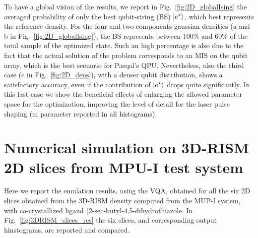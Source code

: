\documentclass[fleqn,10pt]{wlscirep}
\begin{document}
To have a global vision of the results, we report in Fig.~\ref{fig:2D_globalIsing} the averaged probability of only the best qubit-string (BS) $\ket{e^*}$, which best represents the reference density. For the four and two components gaussian densities (a and b in Fig.~\ref{fig:2D_globalIsing}), the BS represents between 100\% and 60\% of the total sample of the optimized state. Such an high percentage is also due to the fact that the actual solution of the problem corresponds to an MIS on the qubit array, which is the best scenario for Pasqal's QPU. Nevertheless, also the third case (c in Fig.~\ref{fig:2D_dens}), with a denser qubit distribution, shows a satisfactory accuracy, even if the contribution of $\ket{e^*}$ drops quite significantly. In this last case we show the beneficial effects of enlarging the allowed parameter space for the optimization, improving the level of detail for the laser pulse shaping (m parameter reported in all histograms).

\section{Numerical simulation on 3D-RISM 2D slices from MPU-I test system}

Here we report the emulation results, using the VQA, obtained for all the six 2D slices obtained from the 3D-RISM density computed from the MUP-I system, with co-crystallized ligand (2-sec-butyl-4,5-dihydrothiazole.
In Fig.~\ref{fig:3DRISM_slices_res} the six slices, and corresponding output hinstograms, are reported and compared.

\end{document}

